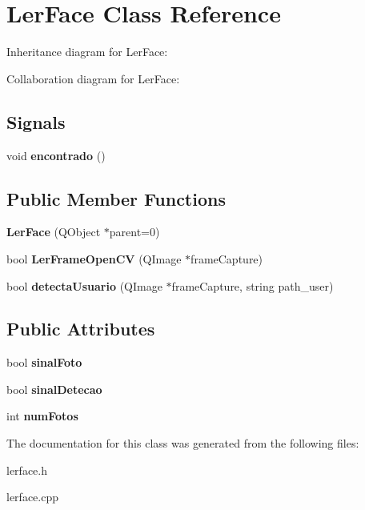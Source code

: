 \hypertarget{classLerFace}{}\section{Ler\+Face Class Reference}
\label{classLerFace}


Inheritance diagram for Ler\+Face\+:


Collaboration diagram for Ler\+Face\+:
\subsection*{Signals}
\begin{DoxyCompactItemize}
\item 
void {\bfseries encontrado} ()\hypertarget{classLerFace_a44cfb4d5edcec999262133eecc5db8ca}{}\label{classLerFace_a44cfb4d5edcec999262133eecc5db8ca}

\end{DoxyCompactItemize}
\subsection*{Public Member Functions}
\begin{DoxyCompactItemize}
\item 
{\bfseries Ler\+Face} (Q\+Object $\ast$parent=0)\hypertarget{classLerFace_a3f3b5ea9fa0b8b72369b26d8a62d4e47}{}\label{classLerFace_a3f3b5ea9fa0b8b72369b26d8a62d4e47}

\item 
bool {\bfseries Ler\+Frame\+Open\+CV} (Q\+Image $\ast$frame\+Capture)\hypertarget{classLerFace_a9aaa104080dc5c19ebecb8f8100d5bf1}{}\label{classLerFace_a9aaa104080dc5c19ebecb8f8100d5bf1}

\item 
bool {\bfseries detecta\+Usuario} (Q\+Image $\ast$frame\+Capture, string path\+\_\+user)\hypertarget{classLerFace_a4c583c451012d0657e6f18a45e1fd682}{}\label{classLerFace_a4c583c451012d0657e6f18a45e1fd682}

\end{DoxyCompactItemize}
\subsection*{Public Attributes}
\begin{DoxyCompactItemize}
\item 
bool {\bfseries sinal\+Foto}\hypertarget{classLerFace_a2de1b8f2ac4b033efedc0495b2256248}{}\label{classLerFace_a2de1b8f2ac4b033efedc0495b2256248}

\item 
bool {\bfseries sinal\+Detecao}\hypertarget{classLerFace_a5369a5293499d722efcae2ee1a4913bb}{}\label{classLerFace_a5369a5293499d722efcae2ee1a4913bb}

\item 
int {\bfseries num\+Fotos}\hypertarget{classLerFace_a3ea5d03ef2dd0065021014be69909d65}{}\label{classLerFace_a3ea5d03ef2dd0065021014be69909d65}

\end{DoxyCompactItemize}


The documentation for this class was generated from the following files\+:\begin{DoxyCompactItemize}
\item 
lerface.\+h\item 
lerface.\+cpp\end{DoxyCompactItemize}
